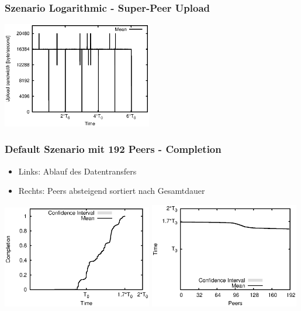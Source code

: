 \begin{frame}
  \frametitle{Szenario Logarithmic - Super-Peer Upload}
  \begin{center}
    \includegraphics[width=0.49\textwidth]{fig/plots/scenario_3_log/plots/GeneratedMeanCurrentSuperSeederUploadBandwidth.csv.eps}
  \end{center}
\end{frame}



\begin{frame}
  \frametitle{Default Szenario mit 192 Peers - Completion}
  \begin{itemize}  
    \item Links: Ablauf des Datentransfers
    \item Rechts: Peers absteigend sortiert nach Gesamtdauer
  \end{itemize}

  \begin{center}
    \includegraphics[width=0.49\textwidth]{fig/plots/scenario_11_peer_count_192_v2/plots/GeneratedMeanChunkCompletion.csv.eps}
    \hfill
    \includegraphics[width=0.49\textwidth]{fig/plots/scenario_11_peer_count_192_v2/plots/GeneratedMeanSortedChunkCompletion.csv.eps}
  \end{center}
\end{frame}


